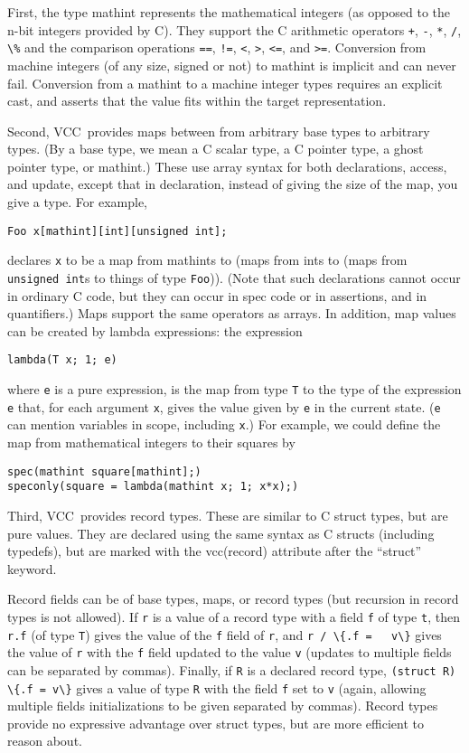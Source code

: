 \documentclass{report}
\newcommand{\Q}[1]{\lstinline~#1~}
\newcommand{\VCC}{VCC}
\begin{document}
First, the type mathint represents the mathematical integers (as
opposed to the n-bit integers provided by C). They support the C
arithmetic operators \Q{+}, \Q{-}, \Q{*}, \Q{/}, \Q{\%} and the
comparison operations \Q{==}, \Q{!=}, \Q{<}, \Q{>}, \Q{<=}, and
\Q{>=}. Conversion from machine integers (of any size, signed or not)
to mathint is implicit and can never fail. Conversion from a mathint
to a machine integer types requires an explicit cast, and asserts that
the value fits within the target representation.

Second, \VCC\ provides maps between from arbitrary base types to
arbitrary types. (By a base type, we mean a C scalar type, a C pointer
type, a ghost pointer type, or mathint.) These use array syntax for
both declarations, access, and update, except that in declaration,
instead of giving the size of the map, you give a type. For example,
\begin{lstlisting}
Foo x[mathint][int][unsigned int];
\end{lstlisting}
declares \Q{x} to be a map from mathints to (maps from ints to (maps
from \Q{unsigned int}s to things of type \Q{Foo})).  (Note that such
declarations cannot occur in ordinary C code, but they can occur in
spec code or in assertions, and in quantifiers.) Maps support the same
operators as arrays. In addition, map values can be created by lambda
expressions: the expression
\begin{lstlisting}
lambda(T x; 1; e)
\end{lstlisting}
where \Q{e} is a pure expression, is the map from type \Q{T} to the type
of the expression \Q{e} that, for each argument \Q{x}, gives the value given
by \Q{e} in the current state. (\Q{e} can mention variables in scope,
including \Q{x}.) For example, we could define the map from mathematical
integers to their squares by
\begin{lstlisting}
spec(mathint square[mathint];)
speconly(square = lambda(mathint x; 1; x*x);)
\end{lstlisting}

Third, \VCC\ provides record types. These are similar to C struct types,
but are pure values. They are declared using the same syntax as C
structs (including typedefs), but are marked with the vcc(record)
attribute after the ``struct'' keyword.

Record fields can be of base types, maps, or record types (but
recursion in record types is not allowed). If \Q{r} is a value of a
record type with a field \Q{f} of type \Q{t}, then \Q{r.f} (of type
\Q{T}) gives the value of the \Q{f} field of \Q{r}, and \Q{r / \{.f =
  v\}} gives the value of \Q{r} with the \Q{f} field updated to the
value \Q{v} (updates to multiple fields can be separated by
commas). Finally, if \Q{R} is a declared record type, \Q{(struct R)
  \{.f = v\}} gives a value of type \Q{R} with the field \Q{f} set to
\Q{v} (again, allowing multiple fields initializations to be given
separated by commas). Record types provide no expressive advantage
over struct types, but are more efficient to reason about.
\end{document}
